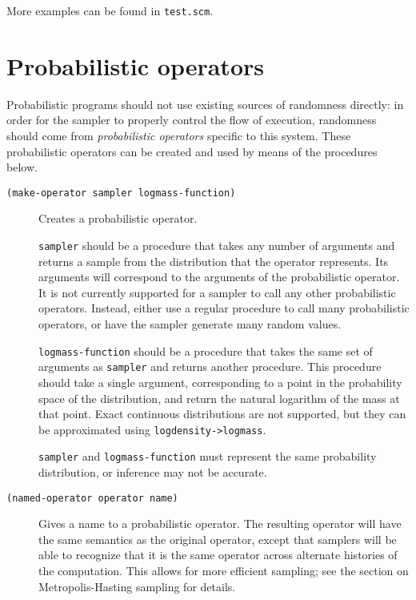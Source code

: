 \documentclass{article}
\begin{document}
More examples can be found in \texttt{test.scm}.

\section{Probabilistic operators}

Probabilistic programs should not use existing sources of randomness
directly: in order for the sampler to properly control the flow of
execution, randomness should come from \textit{probabilistic
  operators} specific to this system. These probabilistic operators
can be created and used by means of the procedures below.

\begin{description}
  \item[\texttt{(make-operator sampler logmass-function)}] \hfill
    
    Creates a probabilistic operator.

    \texttt{sampler} should be a procedure that takes any number of
    arguments and returns a sample from the distribution that the
    operator represents. Its arguments will correspond to the
    arguments of the probabilistic operator. It is not currently
    supported for a sampler to call any other probabilistic
    operators. Instead, either use a regular procedure to call many
    probabilistic operators, or have the sampler generate many random
    values.

    \texttt{logmass-function} should be a procedure that takes the
    same set of arguments as \texttt{sampler} and returns another
    procedure. This procedure should take a single argument,
    corresponding to a point in the probability space of the
    distribution, and return the natural logarithm of the mass at that
    point. Exact continuous distributions are not supported, but they
    can be approximated using \texttt{logdensity->logmass}.

    \texttt{sampler} and \texttt{logmass-function} must represent the
    same probability distribution, or inference may not be accurate.
    
  \item[\texttt{(named-operator operator name)}] \hfill
    
    Gives a name to a probabilistic operator. The resulting operator
    will have the same semantics as the original operator, except that
    samplers will be able to recognize that it is the same operator
    across alternate histories of the computation. This allows for
    more efficient sampling; see the section on Metropolis-Hasting
    sampling for details.


\end{description}
\end{document}
